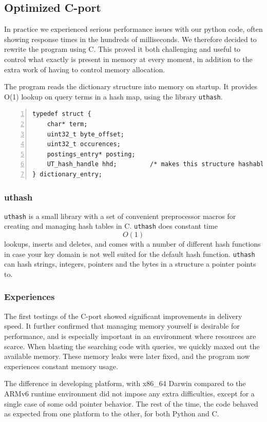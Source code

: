 \subsection{Optimized C-port}
In practice we experienced serious performance issues with our python code, often showing response times in the hundreds of milliseconds. We therefore decided to rewrite the program using C. This proved it both challenging and useful to control what exactly is present in memory at every moment, in addition to the extra work of having to control memory allocation.

The program reads the dictionary structure into memory on startup. It provides O(1) lookup on query terms in a hash map, using the library {\tt uthash}\cite{uthash}.

\begin{lstlisting}[style=customc,captionpos=b,caption={Structure of a dictionary entry (term)},numbers=left]
typedef struct {
    char* term;
    uint32_t byte_offset;
    uint32_t occurences;
    postings_entry* posting;
    UT_hash_handle hhd;         /* makes this structure hashable */
} dictionary_entry;
\end{lstlisting}
\subsubsection{uthash}
{\tt uthash} is a small library with a set of convenient preprocessor macros for creating and managing hash tables in C.
{\tt uthash} does constant time $$O(1)$$ lookups, inserts and deletes, and comes with a number of different hash functions in case your key domain is not well suited for the default hash function.
{\tt uthash} can hash strings, integers, pointers and the bytes in a structure a pointer points to.

\subsubsection{Experiences}
The first testings of the C-port showed significant improvements in delivery speed.
It further confirmed that managing memory yourself is desirable for performance, and is especially important in an environment where resources are scarce.
When blasting the searching code with queries, we quickly maxed out the available memory.
These memory leaks were later fixed, and the program now experiences constant memory usage.

The difference in developing platform, with x86\_64 Darwin compared to the ARMv6 runtime environment did not impose any extra difficulties, except for a single case of some odd pointer behavior.
The rest of the time, the code behaved as expected from one platform to the other, for both Python and C.

